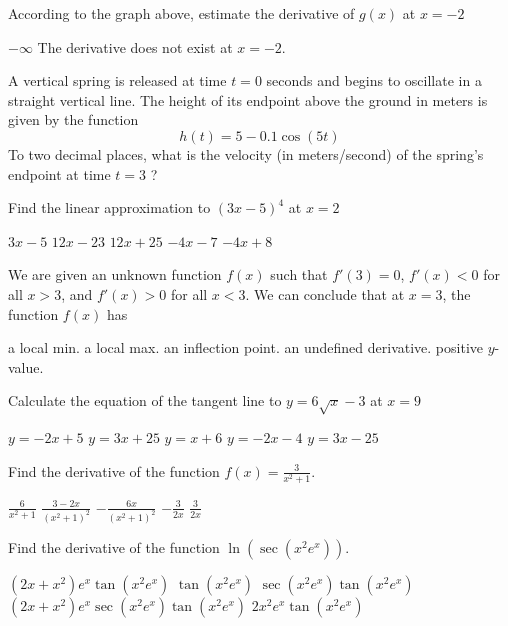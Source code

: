 \documentclass[11pt]{article}
\begin{document}
\begin{questions}
\begin{multiplechoice}{5}
\question According to the graph above, estimate the derivative of $g(x)$ at $x = -2$
\begin{answers}{2}
\ans $-\infty$
\ans The derivative does not exist at $x= -2$.
\end{answers}


\question A vertical spring is released at time $t = 0$ seconds and begins to oscillate in a straight vertical line.
The height of its endpoint above the ground in meters is given by the function
$$h(t) = 5 - 0.1\cos(5t)$$
To two decimal places, what is the velocity (in meters/second) of the spring's endpoint at time $t = 3$ ?
\begin{answers}{2}
\end{answers}

\newpage

\question Find the linear approximation to $(3x-5)^4$ at $x = 2$
\begin{answers}{2}
\ans $3x - 5$
\ans $12x - 23$
\ans $12x + 25$
\ans $-4x - 7$
\ans $-4x + 8$
\end{answers}


\question We are given an unknown function $f(x)$ such that $f'(3) = 0$, $f'(x) < 0$ for all $x > 3$, and $f'(x) > 0$ for all $x < 3$.
We can conclude that at $x = 3$, the function $f(x)$ has 
\begin{answers}{3}
\ans a local min.
\ans a local max.
\ans an inflection point.
\ans an undefined derivative.
\ans positive $y$-value.
\end{answers}

\question Calculate the equation of the tangent line to $y = 6 \sqrt{x} - 3$ at $x = 9$
\begin{answers}{2}
\ans $y = -2x + 5$
\ans $y = 3x + 25$
\ans $y = x + 6$
\ans $y = -2x -4$
\ans $y = 3x - 25$
\end{answers}


\question Find the derivative of the function $\displaystyle f(x) = \frac{3}{x^2 +1}$.
\begin{answers}{2}
\ans $ \displaystyle \frac{6}{x^2 + 1}$
\ans $ \displaystyle  \frac{3 - 2x }{(x^2 + 1)^2}$
\ans $ \displaystyle -\frac{6x}{(x^2 + 1)^2}$
\ans $ \displaystyle  - \frac{3}{2x}$
\ans $ \displaystyle  \frac{3}{2x}$
\end{answers}

\question Find the derivative of the function $\ln(\sec(x^2 e^x))$.
\begin{answers}{2}
\ans $(2x + x^2)e^x \tan(x^2 e^x)$
\ans $\tan(x^2 e^x)$
\ans $ \sec(x^2 e^x)\tan(x^2 e^x)$
\ans $(2x + x^2)e^x \sec(x^2 e^x)\tan(x^2 e^x)$
\ans $2x^2e^x \tan(x^2 e^x)$
\end{answers}


\end{multiplechoice}
\end{questions}
\end{document}
